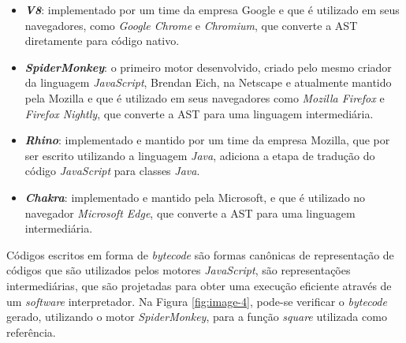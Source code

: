 \begin{itemize}
    \item \textbf{\textit{V8}}: implementado por um time da empresa Google e que é
    utilizado em seus navegadores, como \textit{Google Chrome} e \textit{Chromium}, que
    converte a AST diretamente para código nativo.
    \item \textbf{\textit{SpiderMonkey}}: o primeiro motor desenvolvido, criado pelo mesmo
    criador da linguagem \textit{JavaScript}, Brendan Eich, na Netscape e atualmente
    mantido pela Mozilla e que é utilizado em seus navegadores como
    \textit{Mozilla Firefox} e \textit{Firefox Nightly}, que converte a AST para uma
    linguagem intermediária.
    \item \textbf{\textit{Rhino}}: implementado e mantido por um time da empresa Mozilla,
    que por ser escrito utilizando a linguagem \textit{Java}, adiciona a etapa de tradução
    do código \textit{JavaScript} para classes \textit{Java}.
    \item \textbf{\textit{Chakra}}: implementado e mantido pela Microsoft, e que é
    utilizado no navegador \textit{Microsoft Edge}, que converte a AST para uma linguagem
    intermediária.
\end{itemize}

Códigos escritos em forma de \textit{bytecode} são formas canônicas de representação de
códigos que são utilizados pelos motores \textit{JavaScript}, são representações
intermediárias, que são projetadas para obter uma execução eficiente através de um
\textit{software} interpretador. Na Figura \ref{fig:image-4}, pode-se verificar o
\textit{bytecode} gerado, utilizando o motor \textit{SpiderMonkey}, para a função
\textit{square} utilizada como referência.

\begin{figure}[h!]
    \centering
\end{figure}

